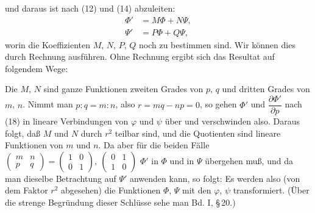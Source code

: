 und daraus ist nach (12) und (14) abzuleiten:
\[
\begin{aligned}
\Phi' &= M\Phi + N\Psi,\\
\Psi' &= P\Phi + Q\Psi,
\end{aligned}
\]
worin die Koeffizienten $M$, $N$, $P$, $Q$ noch zu bestimmen sind.
Wir können dies durch Rechnung ausführen. Ohne Rechnung ergibt sich
das Resultat auf folgendem Wege:

Die $M$, $N$ sind ganze Funktionen zweiten Grades von $p$, $q$ und
dritten Grades von $m$, $n$. Nimmt man $p:q = m:n$, also
$r = mq - np = 0$, so gehen $\Phi'$ und $\dfrac{\partial \Phi'}{\partial p}$
nach (18) in lineare Verbindungen von $\varphi$ und $\psi$ über und
verschwinden also. Daraus folgt, daß $M$ und $N$ durch $r^2$ teilbar
sind, und die Quotienten sind lineare Funktionen von $m$ und $n$. Da
aber für die beiden Fälle $\begin{pmatrix} m & n\\ p & q \end{pmatrix} = \begin{pmatrix} 1 & 0\\ 0 & 1 \end{pmatrix},\ \begin{pmatrix} 0 & 1\\ 1 & 0 \end{pmatrix}$
$\Phi'$ in $\Phi$ und in $\Psi$ übergehen muß, und da man dieselbe
Betrachtung auf $\Psi'$ anwenden kann, so folgt:
Es werden also (von dem Faktor $r^2$ abgesehen) die Funktionen
$\Phi$, $\Psi$ mit den $\varphi$, $\psi$  transformiert.
(Über die strenge Begründung dieser Schlüsse sehe man Bd. I, §\,20.)

